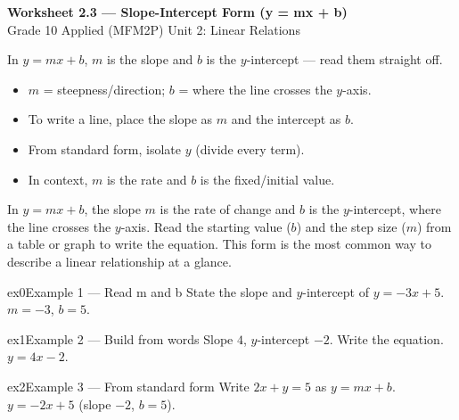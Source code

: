 \documentclass[11pt]{article}
\begin{document}
\begin{center}
{\LARGE\bfseries\color{titleblue}Worksheet 2.3 --- Slope-Intercept Form (y = mx + b)}\\[2pt]
{\small Grade 10 Applied (MFM2P) \textperiodcentered{} Unit 2: Linear Relations}
\end{center}

\begin{ideabox}
In $y=mx+b$, $m$ is the slope and $b$ is the $y$-intercept — read them straight off.
\begin{itemize}[leftmargin=*,itemsep=2pt]
  \item $m$ = steepness/direction; $b$ = where the line crosses the $y$-axis.
  \item To write a line, place the slope as $m$ and the intercept as $b$.
  \item From standard form, isolate $y$ (divide every term).
  \item In context, $m$ is the rate and $b$ is the fixed/initial value.
\end{itemize}
\end{ideabox}

\begin{learnbox}
In $y=mx+b$, the slope $m$ is the rate of change and $b$ is the $y$-intercept, where the line crosses the $y$-axis.
Read the starting value ($b$) and the step size ($m$) from a table or graph to write the equation.
This form is the most common way to describe a linear relationship at a glance.
\end{learnbox}


\begin{example}{ex0}{Example 1 --- Read m and b}
State the slope and $y$-intercept of $y=-3x+5$.\soln $m=-3$, $b=5$.
\end{example}

\begin{example}{ex1}{Example 2 --- Build from words}
Slope $4$, $y$-intercept $-2$. Write the equation.\soln $y=4x-2$.
\end{example}

\begin{example}{ex2}{Example 3 --- From standard form}
Write $2x+y=5$ as $y=mx+b$.\soln $y=-2x+5$ (slope $-2$, $b=5$).
\end{example}
\end{document}
